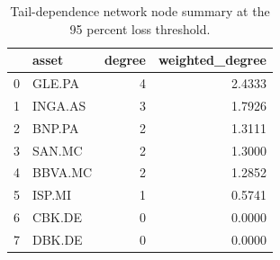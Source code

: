 \begin{table}
\caption{Tail-dependence network node summary at the 95 percent loss threshold.}
\label{tab:tail_dependence_network_summary_q95}
\begin{tabular}{llrr}
\toprule
 & asset & degree & weighted_degree \\
\midrule
0 & GLE.PA & 4 & 2.4333 \\
1 & INGA.AS & 3 & 1.7926 \\
2 & BNP.PA & 2 & 1.3111 \\
3 & SAN.MC & 2 & 1.3000 \\
4 & BBVA.MC & 2 & 1.2852 \\
5 & ISP.MI & 1 & 0.5741 \\
6 & CBK.DE & 0 & 0.0000 \\
7 & DBK.DE & 0 & 0.0000 \\
\bottomrule
\end{tabular}
\end{table}
